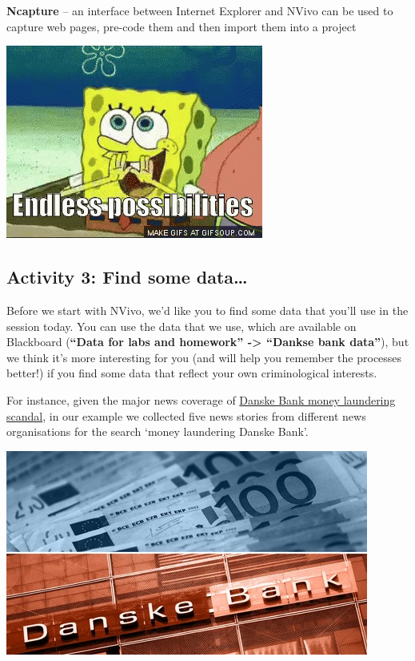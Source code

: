\documentclass[
]{book}
\begin{document}
\textbf{Ncapture} -- an interface between Internet Explorer and NVivo can be used to capture web pages, pre-code them and then import them into a project

\includegraphics{imgs/endless-possibilities.gif}

\hypertarget{activity-3-find-some-data}{%
\subsection{Activity 3: Find some data\ldots{}}\label{activity-3-find-some-data}}

Before we start with NVivo, we'd like you to find some data that you'll use in the session today. You can use the data that we use, which are available on Blackboard (\textbf{``Data for labs and homework'' -\textgreater{} ``Dankse bank data''}), but we think it's more interesting for you (and will help you remember the processes better!) if you find some data that reflect your own criminological interests.

For instance, given the major news coverage of \href{https://en.wikipedia.org/wiki/Danske_Bank_money_laundering_scandal}{Danske Bank money laundering scandal}, in our example we collected five news stories from different news organisations for the search `money laundering Danske Bank'.

\includegraphics{imgs/dankse.jpg}
\end{document}
